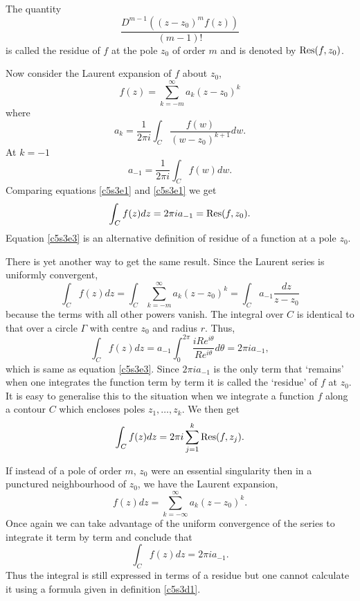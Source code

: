 \begin{defn}\label{c5s3d1}
The quantity
\[
\frac{D^{m-1}((z - z_0)^mf(z))}{(m-1)!}
\]
is called the residue of $f$ at the pole $z_0$ of order $m$ and is denoted by 
$\operatorname{Res}(f,z_0)$.
\end{defn}

Now consider the Laurent expansion of $f$ about $z_0$,
\[
f(z) = \sum_{k=-m}^\infty a_k(z - z_0)^k
\]
where
\[
a_k = \frac{1}{2\pi i}\int_C \frac{f(w)}{(w - z_0)^{k+1}}dw.
\]
At $k = -1$
\begin{equation}\label{c5s3e2}
a_{-1} = \frac{1}{2\pi i}\int_C f(w)dw.
\end{equation}
Comparing equations \eqref{c5s3e1} and \eqref{c5s3e1} we get
\begin{equation}\label{c5s3e3}
\int_C f(z)dz = 2\pi i a_{-1} = \operatorname{Res}(f, z_0).
\end{equation}
Equation \eqref{c5s3e3} is an alternative definition of residue of a 
function at a pole $z_0$.

There is yet another way to get the same result. Since the Laurent series
is uniformly convergent,
\[
\int_C f(z)dz = \int_C \sum_{k=-m}^\infty a_k(z - z_0)^k = 
\int_C a_{-1}\frac{dz}{z - z_0}
\]
because the terms with all other powers vanish. The integral over $C$ is identical 
to that over a circle $\Gamma$ with centre $z_0$ and radius $r$. Thus,
\[
\int_C f(z)dz = a_{-1}\int_0^{2\pi}\frac{iRe^{i\theta}}{Re^{i\theta}}d\theta 
= 2\pi ia_{-1},
\]
which is same as equation \eqref{c5s3e3}. Since $2\pi ia_{-1}$ is the only
term that `remains' when one integrates the function term by term it is called
the `residue' of $f$ at $z_0$. It is easy to generalise this to the situation
when we integrate a function $f$ along a contour $C$ which encloses poles
$z_1, \ldots, z_k$. We then get
\begin{equation}\label{c5s3e4}
\int_C f(z)dz = 2\pi i \sum_{j=1}^k \operatorname{Res}(f, z_j).
\end{equation}

If instead of a pole of order $m$, $z_0$ were an essential singularity then
in a punctured neighbourhood of $z_0$, we have the Laurent expansion,
\[
f(z)dz = \sum_{k=-\infty}^\infty a_k(z - z_0)^k.
\]
Once again we can take advantage of the uniform convergence of the series to
integrate it term by term and conclude that
\begin{equation}\label{c5s3e5}
\int_C f(z)dz = 2\pi i a_{-1}.
\end{equation} 
Thus the integral is still expressed in terms of a residue but one cannot 
calculate it using a formula given in definition \ref{c5s3d1}.

